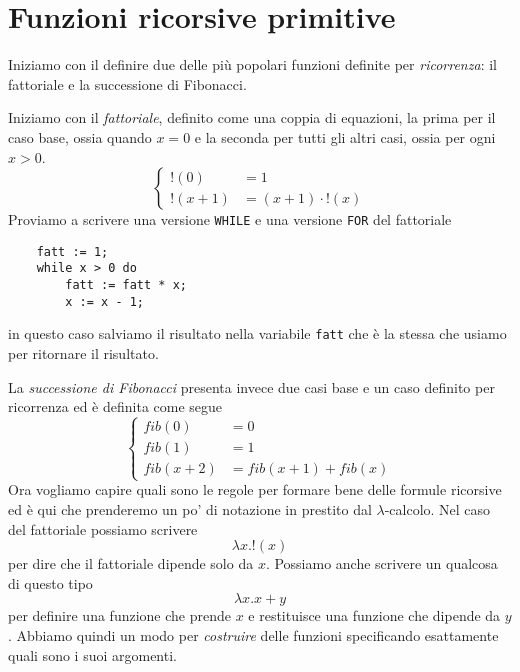 \section{Funzioni ricorsive primitive}
Iniziamo con il definire due delle più popolari funzioni
definite per \emph{ricorrenza}: il fattoriale e la successione
di Fibonacci.

Iniziamo con il \emph{fattoriale}, definito come una coppia
di equazioni, la prima per il caso base, ossia quando $x = 0$
e la seconda per tutti gli altri casi, ossia per ogni $x > 0$.
\[
	\begin{cases}
		!(0)     & = 1                  \\
		!(x + 1) & = (x + 1) \cdot !(x)
	\end{cases}
\]
Proviamo a scrivere una versione \verb|WHILE| e una versione
\verb|FOR| del fattoriale
\begin{verbatim}
    fatt := 1;
    while x > 0 do
        fatt := fatt * x;
        x := x - 1;
\end{verbatim}
in questo caso salviamo il risultato nella variabile
\verb|fatt| che è la stessa che usiamo per ritornare il
risultato.

La \emph{successione di Fibonacci} presenta invece due casi
base e un caso definito per ricorrenza ed è definita come
segue
\[
	\begin{cases}
		fib(0)     & = 0                   \\
		fib(1)     & = 1                   \\
		fib(x + 2) & = fib(x + 1) + fib(x)
	\end{cases}
\]
Ora vogliamo capire quali sono le regole per formare bene
delle formule ricorsive ed è qui che prenderemo un po' di
notazione in prestito dal $\lambda$-calcolo. Nel caso del
fattoriale possiamo scrivere
\[ \lambda x . !(x) \]
per dire che il fattoriale dipende solo da $x$. Possiamo anche
scrivere un qualcosa di questo tipo
\[ \lambda x . x + y \]
per definire una funzione che prende $x$ e restituisce una
funzione che dipende da $y$. Abbiamo quindi un modo per
\emph{costruire} delle funzioni specificando esattamente quali
sono i suoi argomenti.

